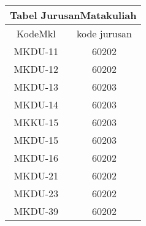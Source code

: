 \documentclass[12pt,a4paper]{article}
\begin{document}
\begin{multicols}{3}
  \begin{adjustbox}{scale=0.5,center}
    \begin{tabular}{ |c|c| } 
      \hline
      \multicolumn{2}{|c|}{Tabel JurusanMatakuliah}  \\ \hline
      KodeMkl & kode jurusan \\ \hline \hline
      MKDU-11 & 60202        \\ \hline                                    
      MKDU-12 & 60202        \\ \hline                                    
      MKDU-13 & 60203        \\ \hline                                    
      MKDU-14 & 60203        \\ \hline                                    
      MKKU-15 & 60203        \\ \hline                                    
      MKDU-15 & 60203        \\ \hline                                    
      MKDU-16 & 60202        \\ \hline                                    
      MKDU-21 & 60202        \\ \hline                                    
      MKDU-23 & 60202        \\ \hline                                    
      MKDU-39 & 60202        \\ \hline
    \end{tabular}
  \end{adjustbox}


\end{multicols}
\end{document}
